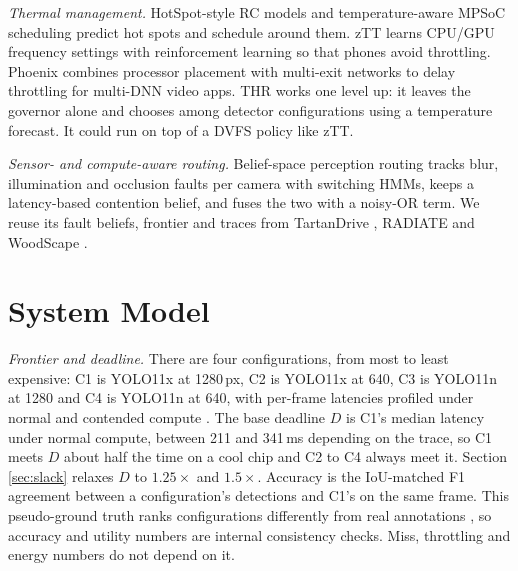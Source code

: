 \documentclass[conference,compsoc]{IEEEtran}
\begin{document}
\textit{Thermal management.} HotSpot-style RC models
\cite{skadron2003hotspot} and temperature-aware MPSoC scheduling
\cite{coskun2007temperature} predict hot spots and schedule around
them. zTT \cite{kim2021ztt} learns CPU/GPU frequency settings with
reinforcement learning so that phones avoid throttling. Phoenix
\cite{jeon2026phoenix} combines processor placement with multi-exit
networks to delay throttling for multi-DNN video apps. THR works one
level up: it leaves the governor alone and chooses among detector
configurations using a temperature forecast. It could run on top of a
DVFS policy like zTT.

\textit{Sensor- and compute-aware routing.} Belief-space perception
routing \cite{roy2026beliefspace} tracks blur, illumination and
occlusion faults per camera with switching HMMs, keeps a latency-based
contention belief, and fuses the two with a noisy-OR term. We reuse its
fault beliefs, frontier and traces from TartanDrive
\cite{triest2022tartandrive,sivaprakasam2024tartandrive2}, RADIATE
\cite{sheeny2021radiate} and WoodScape \cite{yogamani2019woodscape}.

\section{System Model}
\label{sec:model}

\textit{Frontier and deadline.} There are four configurations, from most
to least expensive: C1 is YOLO11x at 1280\,px, C2 is YOLO11x at 640, C3
is YOLO11n at 1280 and C4 is YOLO11n at 640, with per-frame latencies
profiled under normal and contended compute \cite{roy2026beliefspace}.
The base deadline $D$ is C1's median latency under normal compute,
between 211 and 341\,ms depending on the trace, so C1 meets $D$ about
half the time on a cool chip and C2 to C4 always meet it. Section
\ref{sec:slack} relaxes $D$ to $1.25\times$ and $1.5\times$. Accuracy is
the IoU-matched F1 agreement between a configuration's detections and
C1's on the same frame. This pseudo-ground truth ranks configurations
differently from real annotations \cite{roy2026beliefspace}, so
accuracy and utility numbers are internal consistency checks. Miss,
throttling and energy numbers do not depend on it.
\end{document}
